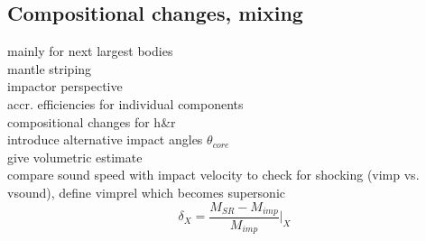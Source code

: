 \subsection{Compositional changes, mixing}
mainly for next largest bodies\\
mantle striping\\
impactor perspective\\
accr. efficiencies for individual components \\
compositional changes for h\&r \\
introduce alternative impact angles $\theta_{core}$ \\
give volumetric estimate \\
compare sound speed with impact velocity to check for shocking (vimp vs. vsound), define vimprel which becomes supersonic \\

\begin{equation}
\delta_X = \frac{M_{SR} - M_{imp}}{M_{imp}} \Bigg|_{X}
\end{equation}

